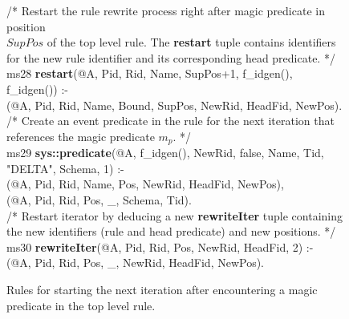 %	
%

\begin{figure}[!t]
\ssp
\centering
\begin{boxedminipage}{\linewidth}
/* Restart the rule rewrite process right after magic predicate in position  \\
$SupPos$ of the top level rule. The {\bf restart} tuple contains identifiers  \\
for the new rule identifier and its corresponding head predicate. */ \\
ms28 {\bf restart}(@A, Pid, Rid, Name, SupPos+1, f\_idgen(), f\_idgen()) :- \\
(@A, Pid, Rid, Name, Bound, SupPos, NewRid, HeadFid, NewPos). \\
	
/* Create an event predicate in the rule for the next iteration that  \\
references the magic predicate $m_p$. */ \\
ms29 {\bf sys::predicate}(@A, f\_idgen(), NewRid, false, Name, Tid, "DELTA", Schema, 1) :- \\
(@A, Pid, Rid, Name, Pos, NewRid, HeadFid, NewPos), \\
(@A, Pid, Rid, Pos, \_, Schema, Tid). \\
	
/* Restart iterator by deducing a new {\bf rewriteIter} tuple containing \\
the new identifiers (rule and head predicate) and new positions. */ \\
ms30 {\bf rewriteIter}(@A, Pid, Rid, Pos, NewRid, HeadFid, 2) :- \\
(@A, Pid, Rid, Pos, \_, NewRid, HeadFid, NewPos). \\

\end{boxedminipage}
\caption{\label{ch:magic:fig:rewrite7}Rules for starting the next iteration after
encountering a magic predicate in the top level rule. }
\end{figure}

